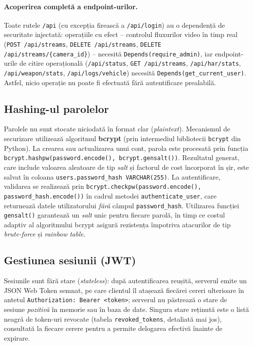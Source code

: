 \documentclass[../../main.tex]{subfiles}
\begin{document}
\paragraph*{Acoperirea completă a endpoint-urilor.} Toate rutele \texttt{/api} (cu excepția firească a \texttt{/api/login}) au o dependență de securitate injectată: operațiile cu efect -- controlul fluxurilor video în timp real (\texttt{POST /api/streams}, \texttt{DELETE /api/streams}, \texttt{DELETE /api/streams/\{camera\_id\}}) -- necesită \texttt{Depends(\linebreak require\_admin)}, iar endpoint-urile de citire operațională (\texttt{/api/status}, \texttt{GET /api/streams}, \texttt{/api/har/stats}, \texttt{/api/weapon/stats}, \texttt{/api/logs/vehicle}) necesită \texttt{Depends(get\_current\_user)}. Astfel, nicio operație nu poate fi efectuată fără autentificare prealabilă.

\subsection{Hashing-ul parolelor}

Parolele nu sunt stocate niciodată în format clar (\emph{plaintext}). Mecanismul de securizare utilizează algoritmul \textbf{bcrypt} (prin intermediul bibliotecii \texttt{bcrypt} din Python). La crearea sau actualizarea unui cont, parola este procesată prin funcția \texttt{bcrypt.hashpw(password.encode(), bcrypt.gensalt())}. Rezultatul generat, care include valoarea aleatoare de tip \emph{salt} și factorul de cost încorporat în șir, este salvat în coloana \texttt{users.password\_hash VARCHAR(255)}. La autentificare, validarea se realizează prin \texttt{bcrypt.checkpw(password.encode(), password\_hash.encode())} în cadrul metodei \texttt{authenticate\_user}, care returnează datele utilizatorului \emph{fără} câmpul \texttt{password\_hash}. Utilizarea funcției \texttt{gensalt()} garantează un \emph{salt} unic pentru fiecare parolă, în timp ce costul adaptiv al algoritmului bcrypt asigură rezistența împotriva atacurilor de tip \emph{brute-force} și \emph{rainbow table}.

\subsection{Gestiunea sesiunii (JWT)}

Sesiunile sunt fără stare (\emph{stateless}): după autentificarea reușită, serverul emite un JSON Web Token semnat, pe care clientul îl atașează fiecărei cereri ulterioare în antetul \texttt{Authorization: Bearer <token>}; serverul nu păstrează o stare de sesiune \emph{pozitivă} în memorie sau în baza de date. Singura stare reținută este o listă neagră de token-uri revocate (tabela \texttt{revoked\_tokens}, detaliată mai jos), consultată la fiecare cerere pentru a permite delogarea efectivă înainte de expirare.
\end{document}
